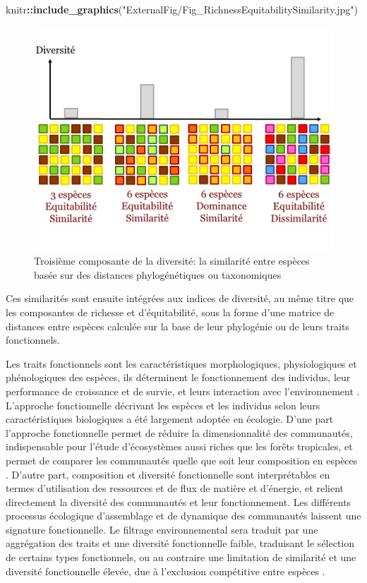 \documentclass[
  11pt,
  french,
  A4paper,
  extrafontsizes,onecolumn,openright
  ]{memoir}
\newenvironment{Shaded}{\begin{snugshade}}{\end{snugshade}}
\newcommand{\KeywordTok}[1]{\textcolor[rgb]{0.13,0.29,0.53}{\textbf{#1}}}
\newcommand{\StringTok}[1]{\textcolor[rgb]{0.31,0.60,0.02}{#1}}
\newcommand{\OperatorTok}[1]{\textcolor[rgb]{0.81,0.36,0.00}{\textbf{#1}}}
\newcommand{\NormalTok}[1]{#1}
\begin{document}
\begin{Shaded}
\begin{Highlighting}[]
\NormalTok{knitr}\OperatorTok{::}\KeywordTok{include_graphics}\NormalTok{(}\StringTok{"ExternalFig/Fig_RichnessEquitabilitySimilarity.jpg"}\NormalTok{)}
\end{Highlighting}
\end{Shaded}

\begin{figure}

{\centering \includegraphics[width=0.6\linewidth]{ExternalFig/Fig_RichnessEquitabilitySimilarity} 

}

\caption{Troisième composante de la diversité: la similarité entre espèces basée sur des distances phylogénétiques ou taxonomiques}\label{fig:RichEquSim}
\end{figure}

Ces similarités sont ensuite intégrées aux indices de diversité, au même
titre que les composantes de richesse et d'équitabilité, sous la forme
d'une matrice de distances entre espèces calculée sur la base de leur
phylogénie ou de leurs traits fonctionnels.

Les traits fonctionnels sont les caractéristiques morphologiques,
physiologiques et phénologiques des espèces, ils déterminent le
fonctionnement des individus, leur performance de croissance et de
survie, et leurs interaction avec l'environnement
\autocite{Violle2007b}. L'approche fonctionnelle décrivant les espèces
et les individus selon leurs caractéristiques biologiques a été
largement adoptée en écologie. D'une part l'approche fonctionnelle
permet de réduire la dimensionnalité des communautés, indispensable pour
l'étude d'écosystèmes aussi riches que les forêts tropicales, et permet
de comparer les communautés quelle que soit leur composition en espèces
\autocites{Begon2006}{Scheiter2013}{Mouillot2013a}{Sakschewski2016}.
D'autre part, composition et diversité fonctionnelle sont interprétables
en termes d'utilisation des ressources et de flux de matière et
d'énergie, et relient directement la diversité des communautés et leur
fonctionnement. Les différents processus écologique d'assemblage et de
dynamique des communautés laissent une signature fonctionnelle. Le
filtrage environnemental sera traduit par une aggrégation des traits et
une diversité fonctionnelle faible, traduisant le sélection de certains
types fonctionnels, ou au contraire une limitation de similarité et une
diversité fonctionnelle élevée, due à l'exclusion compétitive entre
espèces \autocites{McGill2006}{Kunstler2012}.
\end{document}
